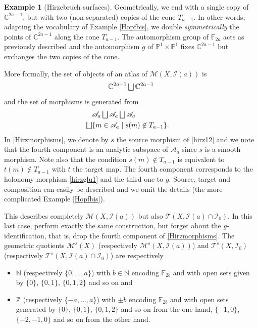 \documentclass[JEP,XML,SOM,Unicode]{cedram}
\let\mathcal\mathscr
\let\oldbigsqcup\bigsqcup
\renewcommand{\bigsqcup}{\mathop{\textstyle\oldbigsqcup}\displaylimits}
\theoremstyle{plain}
\theoremstyle{definition}
\newtheorem{example}[theorem]{Example}
\theoremstyle{remark}
\numberwithin{equation}{section}
\newcommand{\CC}{{\mathbb{C}}}
\newcommand{\cI}{\mathcal{I}}
\let\uniondisjointe\bigsqcup
\begin{document}
\begin{example}[Hirzebruch surfaces]
Geometrically, we end with a single copy of $\CC^{2a-1}$, but with two (non-separated) copies of the cone $T_{a-1}$. In other words, adapting the vocabulary of Example \ref{Hopfbis}, we double \emph{symmetrically} the points of $\CC^{2a-1}$ along the cone $T_{a-1}$. The automorphism group of $\mathbb F_{2a}$ acts as previously described and the automorphism $g$ of $\mathbb P^1\times\mathbb P^1$ fixes $\CC^{2a-1}$ but exchanges the two copies of the cone.

More formally, the set of objects of an atlas of $\mathcal M(X,\cI(a))$ is
\begin{equation}
\label{Hirzobjects}
\CC^{2a-1}\uniondisjointe \CC^{2a-1}
\end{equation}
and the set of morphisms is generated from
\begin{equation}
\label{Hirzmorphisms}
\begin{aligned}
&\mathcal A_a\uniondisjointe \mathcal A_a\uniondisjointe \mathcal A_a\cr
\uniondisjointe &\{m\in\mathcal A_a\mid s(m)\not\in T_{a-1}\}.
\end{aligned}
\end{equation}
In \eqref{Hirzmorphisms}, we denote by $s$ the source morphism of \eqref{hirz12} and we note that the fourth component is an analytic subspace of $\mathcal A_a$ since $s$ is a smooth morphism. Note also that the condition $s(m)\not\in T_{a-1}$ is equivalent to $t(m)\not\in T_{a-1}$ with $t$ the target map. The fourth component corresponds to the holonomy morphism \eqref{hirzglu1} and the third one to $g$. Source, target and composition can easily be described and we omit the details (\cf the more complicated Example \ref{Hopfbis}).

This describes completely $\mathcal M(X,\cI(a))$ but also $\mathcal T(X,\cI(a)\cap \cI_0)$. In this last case, perform exactly the same construction, but forget about the $g$-identification, that is, drop the fourth component of \eqref{Hirzmorphisms}. The geometric quotients $\mathcal M^s(X)$ (respectively $\mathcal M^s(X,\cI(a))$) and $\mathcal T^s(X,\cI_0)$ (respectively $\mathcal T^s(X,\cI(a)\cap \cI_0)$) are respectively
\begin{itemize}
\item $\mathbb N$ (respectively $\{0,\hdots,a\}$) with $b\in \mathbb N$ encoding $\mathbb F_{2b}$ and with open sets given by $\{0\}$, $\{0,1\}$, $\{0,1,2\}$ and so on and
\item $\mathbb Z$ (respectively $\{-a,\hdots,a\}$) with $\pm b$ encoding $\mathbb F_{2b}$ and with open sets generated by $\{0\}$, $\{0,1\}$, $\{0,1,2\}$ and so on from the one hand, $\{-1,0\}$, $\{-2,-1,0\}$ and so on from the other hand.
\end{itemize}
\end{example}
\end{document}
